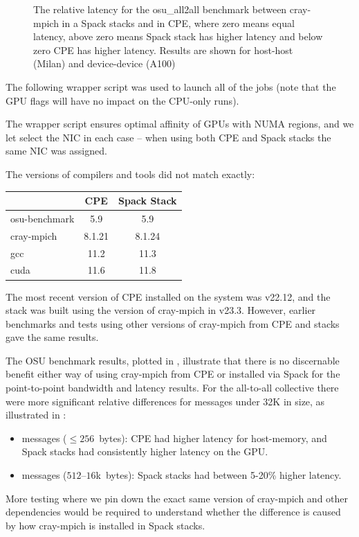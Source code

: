 \begin{figure}[htp!]
    \begin{center}
        
    \end{center}
    \caption{The relative latency for the osu\_all2all benchmark between cray-mpich in a Spack stacks and in CPE, where zero means equal latency, above zero means Spack stack has higher latency and below zero CPE has higher latency. Results are shown for host-host (Milan) and device-device (A100)}
    \label{fig:osu-a2a-relative}
\end{figure}

The following wrapper script was used to launch all of the jobs (note that the GPU flags will have no impact on the CPU-only runs).

The wrapper script ensures optimal affinity of GPUs with NUMA regions, and we let \craympich select the NIC in each case -- when using both CPE and Spack stacks the same NIC was assigned.

The versions of compilers and tools did not match exactly:
\begin{center}
    \begin{tabular}{l |c  c }
                      & CPE   & Spack Stack \\
          \hline
        osu-benchmark & 5.9   & 5.9       \\
        cray-mpich    & 8.1.21& 8.1.24    \\
        gcc           & 11.2  & 11.3      \\
        cuda          & 11.6  & 11.8      \\
    \end{tabular}
\end{center}

The most recent version of CPE installed on the system was v22.12, and the stack was built using the version of cray-mpich in v23.3. However, earlier benchmarks and tests using other versions of cray-mpich from CPE and \spack stacks gave the same results.

The OSU benchmark results, plotted in , illustrate that there is no discernable benefit either way of using cray-mpich from CPE or installed via Spack for the point-to-point bandwidth and latency results.
For the all-to-all collective there were more significant relative differences for messages under 32K in size, as illustrated in :
\begin{itemize}
    \item messages ($\leq 256$~bytes): CPE had higher latency for host-memory, and Spack stacks had consistently higher latency on the GPU.
    \item messages ($512$--$16$k~bytes): Spack stacks had between 5-20\% higher latency.
\end{itemize}
More testing where we pin down the exact same version of cray-mpich and other dependencies would be required to understand whether the difference is caused by how cray-mpich is installed in Spack stacks.

